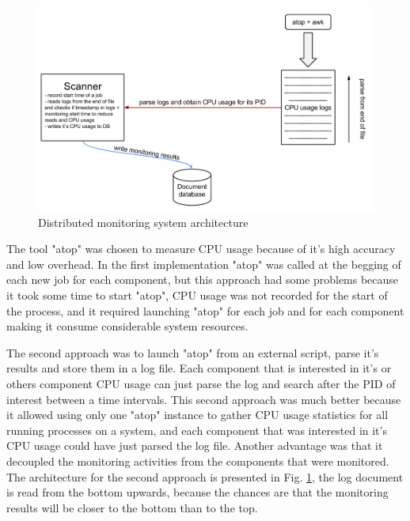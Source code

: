 \begin{figure}[t]
\centering
\includegraphics[width=\linewidth]{./img/MonitoringCPUMechanism.png}
\caption{Distributed monitoring system architecture}
\label{fig:monitoringArchitecture}
\end{figure} 
 
The tool "atop" was chosen to measure CPU usage because of it's high accuracy and low overhead. In the first implementation "atop" was called at the begging of each new job for each component, but this approach had some problems because it took some time to start "atop", CPU usage was not recorded for the start of the process, and it required launching "atop" for each job and for each component making it consume considerable system resources. 

The second approach was to launch "atop" from an external script, parse it's results and store them in a log file. Each component that is interested in it's or others component CPU usage can just parse the log and search after the PID of interest between a time intervals. This second approach was much better because it allowed using only one "atop" instance to gather CPU usage statistics for all running processes on a system, and each component that was interested in it's CPU usage could have just parsed the log file. Another advantage was that it decoupled the monitoring activities from the components that were monitored. The architecture for the second approach is presented in Fig. \ref{fig:monitoringArchitecture}, the log document is read from the bottom upwards, because the chances are that the monitoring results will be closer to the bottom than to the top.

